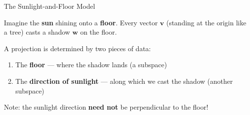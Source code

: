 \documentclass[10pt]{beamer}
\theoremstyle{definition}
\newcommand{\x}[1]{\alert{\textbf{#1}}}
\begin{document}
\begin{frame}{The Sunlight-and-Floor Model}

Imagine the \x{sun} shining onto a \x{floor}. Every vector $\mathbf{v}$ (standing at the origin like a tree) casts a shadow $\mathbf{w}$ on the floor.

\begin{center}
\end{center}

A projection is determined by two pieces of data:
\begin{enumerate}
\item The \x{floor} --- where the shadow lands (a subspace)
\item The \x{direction of sunlight} --- along which we cast the shadow (another subspace)
\end{enumerate}

\vspace{0.3em}

Note: the sunlight direction \x{need not} be perpendicular to the floor!

\end{frame}
\end{document}
